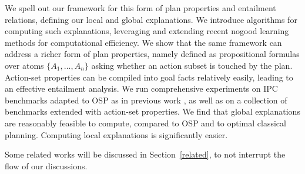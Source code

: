 We spell out our framework for this form of plan properties and
entailment relations, defining our local and global explanations. We
introduce algorithms for computing such explanations, leveraging and
extending recent nogood learning methods
\cite{steinmetz:hoffmann:ai-17,steinmetz:hoffmann:ijcai-17} for
computational efficiency. We show that the same framework can address
a richer form of plan properties, namely  defined as propositional formulas over atoms $\{A_1,
\dots, A_n\}$ asking whether an action subset is touched by the
plan. Action-set properties can be compiled into goal facts relatively
easily, leading to an effective entailment analysis. We run
comprehensive experiments on IPC benchmarks adapted to OSP as in
previous work \cite{domshlak:mirkis:jair-15,katz:etal:icaps-19}, as
well as on a collection of benchmarks extended with action-set
properties. We find that global explanations are reasonably feasible
to compute, compared to OSP and to optimal classical
planning. Computing local explanations is significantly easier.
%
%

Some related works will be discussed in Section~\ref{related}, to not
interrupt the flow of our discussions.



















